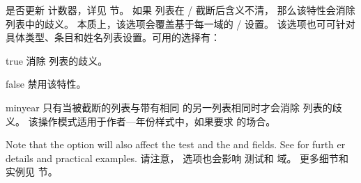 \begin{optionlist}

是否更新  计数器，详见  节。
如果  列表在 \slash {} 截断后含义不清，
那么该特性会消除  列表中的歧义。
本质上，该选项会覆盖基于每一域的 \slash {} 设置。
该选项也可可针对具体类型、条目和姓名列表设置。可用的选择有：

\begin{valuelist}
\item[true] %
消除  列表的歧义。
\item[false] %
禁用该特性。
\item[minyear] %
只有当被截断的列表与带有相同  的另一列表相同时才会消除  列表的歧义。
该操作模式适用于作者---年份样式中，如果要求  的场合。
\end{valuelist}
%

Note that the  option will also affect the  test and the  and  fields. See  for furth
er details and practical examples.
请注意， 选项也会影响  测试和  域。
更多细节和实例见  节。





\end{optionlist}
